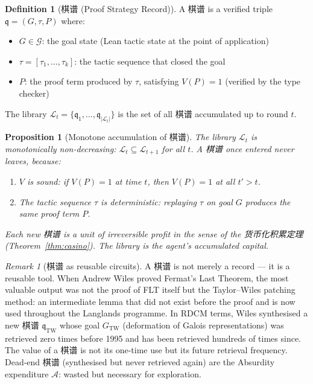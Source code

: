 \documentclass[11pt,a4paper]{article}
\newtheorem{proposition}[theorem]{Proposition}
\theoremstyle{definition}
\newtheorem{definition}[theorem]{Definition}
\theoremstyle{remark}
\newtheorem{remark}[theorem]{Remark}
\begin{document}
\begin{definition}[棋谱 (Proof Strategy Record)]\label{def:qipu}
A 棋谱 is a verified triple $\mathfrak{q} = (G, \tau, P)$ where:
\begin{itemize}[nosep]
  \item $G \in \mathcal{G}$: the goal state (Lean tactic state at the point of application)
  \item $\tau = [\tau_1, \ldots, \tau_k]$: the tactic sequence that closed the goal
  \item $P$: the proof term produced by $\tau$, satisfying $V(P) = 1$ (verified by the type checker)
\end{itemize}
The library $\mathcal{L}_t = \{\mathfrak{q}_1, \ldots, \mathfrak{q}_{|\mathcal{L}_t|}\}$ is the set of all 棋谱 accumulated up to round $t$.
\end{definition}

\begin{proposition}[Monotone accumulation of 棋谱]\label{prop:qipu_mono}
The library $\mathcal{L}_t$ is monotonically non-decreasing: $\mathcal{L}_t \subseteq \mathcal{L}_{t+1}$ for all $t$. A 棋谱 once entered never leaves, because:
\begin{enumerate}[nosep]
  \item[(i)] $V$ is sound: if $V(P) = 1$ at time $t$, then $V(P) = 1$ at all $t' > t$.
  \item[(ii)] The tactic sequence $\tau$ is deterministic: replaying $\tau$ on goal $G$ produces the same proof term $P$.
\end{enumerate}
Each new 棋谱 is a unit of irreversible profit in the sense of the 货币化积累定理 (Theorem~\ref{thm:casino}). The library is the agent's accumulated capital.
\end{proposition}

\begin{remark}[棋谱 as reusable circuits]
A 棋谱 is not merely a record --- it is a reusable tool. When Andrew Wiles proved Fermat's Last Theorem, the most valuable output was not the proof of FLT itself but the Taylor--Wiles patching method: an intermediate lemma that did not exist before the proof and is now used throughout the Langlands programme. In RDCM terms, Wiles synthesised a new 棋谱 $\mathfrak{q}_{\mathrm{TW}}$ whose goal $G_{\mathrm{TW}}$ (deformation of Galois representations) was retrieved zero times before 1995 and has been retrieved hundreds of times since. The value of a 棋谱 is not its one-time use but its future retrieval frequency. Dead-end 棋谱 (synthesised but never retrieved again) are the Absurdity expenditure $\mathcal{A}$: wasted but necessary for exploration.
\end{remark}
\end{document}
